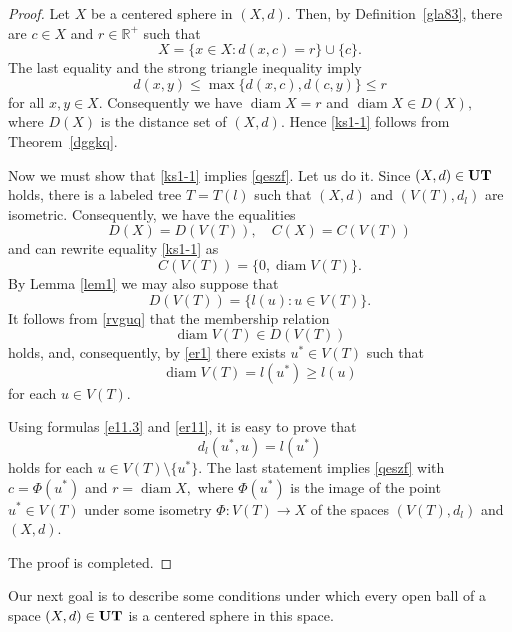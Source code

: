 \documentclass{article}
\begin{document}
\begin{proof}
Let $X$ be a centered sphere in $(X,d)$.
Then, by Definition~\ref{gla83}, there are $c\in X$ and $r\in \mathbb{R}^+$ such that
\begin{equation}
    \label{qeszf}
X=\{x\in X : d(x,c)=r\}\cup\{c\}. 
\end{equation}
The last equality and the strong triangle inequality imply
\[
d(x,y)\leq \max\{d(x,c),d(c,y)\}\leq r
\]
for all $x,y\in X$.
Consequently we have
\(
\operatorname{diam} X = r 
\)
and
\(
\operatorname{diam} X \in D(X), 
\)
where $D(X)$ is the distance set of $(X,d)$.
Hence \eqref{ks1-1}  follows from Theorem~\ref{dggkq}.




Now we must show that \eqref{ks1-1}  implies \eqref{qeszf}.
Let us do it.
Since $(X,d)\in\bf UT$ holds, there is a labeled tree $T=T(l)$ such that $(X,d)$ and $(V(T),d_l)$ are isometric.
Consequently, we have the equalities
\[
D(X)=D(V(T)), \quad C(X)=C(V(T))
\]
and can rewrite equality \eqref{ks1-1}  as
\begin{equation}
    \label{rvguq}
C(V(T))=\{0,\operatorname{diam} V(T)\}. 
\end{equation}
By Lemma \ref{lem1} we may also suppose that
\begin{equation}
    \label{er1}
D(V(T))=\{l(u)\colon u\in V(T) \}.
\end{equation}
It follows from \eqref{rvguq} that
the membership relation
\[
\operatorname{diam} V(T) \in D(V(T))
\]
holds, and, consequently, by \eqref{er1} there exists \( u^{*} \in V(T) \) such that
\begin{equation}
    \label{er11}
\operatorname{diam}V(T)=l(u^{*}) \geq l(u) 
\end{equation}
for each \( u \in V(T) \).

Using formulas \eqref{e11.3} and  \eqref{er11}, it is easy to prove that
\[
d_l(u^*,u)=l(u^*)
\]
holds for each $u\in V(T)\setminus\{u^*\}.$
The last statement implies  \eqref{qeszf} with
\(
c=\Phi(u^*) \) and \(r=\operatorname{diam} X,
\)
where $\Phi(u^*)$ is the image of the point $u^*\in V(T)$ under some isometry
\(
\Phi:V(T)\to X
\)
of the spaces $(V(T),d_l)$ and $(X,d)$.

The proof is completed.
\end{proof}




Our next goal is to describe some conditions under which every open ball of a space $(X,d)\in {\bf UT}$ is a centered sphere in this space.
\end{document}
